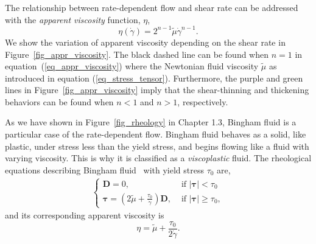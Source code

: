 \par
The relationship between rate-dependent flow and shear rate can be addressed with the \textit{apparent viscosity} function, $\eta$,
\begin{equation}
  \eta(\dot{\gamma})
    =2^{n-1} \tilde{\mu} \dot{\gamma} ^{n-1}.
  \label{eq_appr_viscosity}
\end{equation}
We show the variation of apparent viscosity depending on the shear rate in Figure~\ref{fig_appr_viscosity}.
The black dashed line can be found when $n = 1$ in equation~(\ref{eq_appr_viscosity}) where the Newtonian fluid viscosity $\tilde{\mu}$ as introduced in equation (\ref{eq_stress_tensor}). 
Furthermore, the purple and green lines in Figure~\ref{fig_appr_viscosity} imply that the shear-thinning and thickening behaviors can be found when $n < 1$ and $n>1$, respectively. 
\par
As we have shown in Figure~\ref{fig_rheology} in Chapter 1.3, Bingham fluid is a particular case of the rate-dependent flow. 
Bingham fluid behaves as a solid, like plastic, under stress less than the yield stress, and begins flowing like a fluid with varying viscosity. 
This is why it is classified as a \textit{viscoplastic} fluid.
The rheological equations describing Bingham fluid~\cite{bingham_investigation_1917} with yield stress $\tau_0$ are,
\begin{align}
  \left\{\begin{matrix}
 {\bm D} =0, & \text { if } |{\bm \tau} | <\tau_0 \\
  {\bm \tau}  = 
\left(2 \tilde{\mu} + \frac{\tau_0}{ \dot{\gamma}}\right) {\bm D} , & \text { if } |{\bm \tau}|\geq \tau_0,
\end{matrix}\right.
\label{eq_Bingham}
  \end{align}
and its corresponding apparent viscosity is
\begin{equation}
  \eta=\tilde{\mu} +\frac{\tau_0}{2 \dot{\gamma}}.
  \end{equation}
